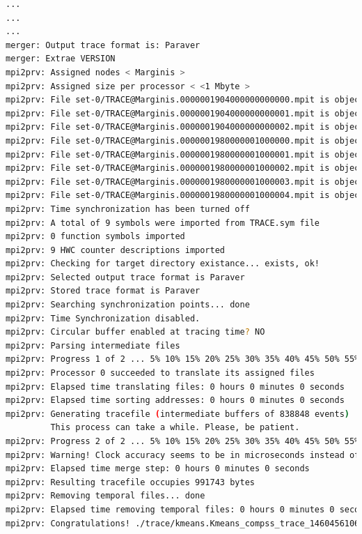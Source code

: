 \begin{lstlisting}[language=bash]
...
...
...
merger: Output trace format is: Paraver
merger: Extrae VERSION
mpi2prv: Assigned nodes < Marginis >
mpi2prv: Assigned size per processor < <1 Mbyte >
mpi2prv: File set-0/TRACE@Marginis.0000001904000000000000.mpit is object 1.1.1 on node Marginis assigned to processor 0
mpi2prv: File set-0/TRACE@Marginis.0000001904000000000001.mpit is object 1.1.2 on node Marginis assigned to processor 0
mpi2prv: File set-0/TRACE@Marginis.0000001904000000000002.mpit is object 1.1.3 on node Marginis assigned to processor 0
mpi2prv: File set-0/TRACE@Marginis.0000001980000001000000.mpit is object 1.2.1 on node Marginis assigned to processor 0
mpi2prv: File set-0/TRACE@Marginis.0000001980000001000001.mpit is object 1.2.2 on node Marginis assigned to processor 0
mpi2prv: File set-0/TRACE@Marginis.0000001980000001000002.mpit is object 1.2.3 on node Marginis assigned to processor 0
mpi2prv: File set-0/TRACE@Marginis.0000001980000001000003.mpit is object 1.2.4 on node Marginis assigned to processor 0
mpi2prv: File set-0/TRACE@Marginis.0000001980000001000004.mpit is object 1.2.5 on node Marginis assigned to processor 0
mpi2prv: Time synchronization has been turned off
mpi2prv: A total of 9 symbols were imported from TRACE.sym file
mpi2prv: 0 function symbols imported
mpi2prv: 9 HWC counter descriptions imported
mpi2prv: Checking for target directory existance... exists, ok!
mpi2prv: Selected output trace format is Paraver
mpi2prv: Stored trace format is Paraver
mpi2prv: Searching synchronization points... done
mpi2prv: Time Synchronization disabled.
mpi2prv: Circular buffer enabled at tracing time? NO
mpi2prv: Parsing intermediate files
mpi2prv: Progress 1 of 2 ... 5% 10% 15% 20% 25% 30% 35% 40% 45% 50% 55% 60% 65% 70% 75% 80% 85% 90% 95% done
mpi2prv: Processor 0 succeeded to translate its assigned files
mpi2prv: Elapsed time translating files: 0 hours 0 minutes 0 seconds
mpi2prv: Elapsed time sorting addresses: 0 hours 0 minutes 0 seconds
mpi2prv: Generating tracefile (intermediate buffers of 838848 events)
         This process can take a while. Please, be patient.
mpi2prv: Progress 2 of 2 ... 5% 10% 15% 20% 25% 30% 35% 40% 45% 50% 55% 60% 65% 70% 75% 80% 85% 90% 95% done
mpi2prv: Warning! Clock accuracy seems to be in microseconds instead of nanoseconds.
mpi2prv: Elapsed time merge step: 0 hours 0 minutes 0 seconds
mpi2prv: Resulting tracefile occupies 991743 bytes
mpi2prv: Removing temporal files... done
mpi2prv: Elapsed time removing temporal files: 0 hours 0 minutes 0 seconds
mpi2prv: Congratulations! ./trace/kmeans.Kmeans_compss_trace_1460456106.prv has been generated.

\end{lstlisting}
